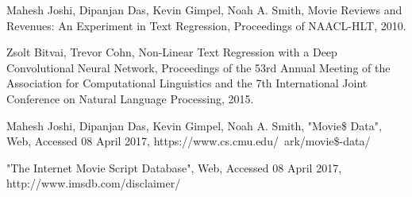 \documentclass[11pt]{article}
\begin{document}
\begin{thebibliography}{9}

  Mahesh Joshi, Dipanjan Das, Kevin Gimpel, Noah A. Smith,
  Movie Reviews and Revenues: An Experiment in Text Regression,
  Proceedings of NAACL-HLT,
  2010.
  
    Zsolt Bitvai, Trevor Cohn,
    Non-Linear Text Regression with a Deep Convolutional Neural Network,
    Proceedings of the 53rd Annual Meeting of the Association for Computational Linguistics
    and the 7th International Joint Conference on Natural Language Processing,
    2015.
    
  Mahesh Joshi, Dipanjan Das, Kevin Gimpel, Noah A. Smith,
  "Movie\$ Data",
  Web,
  Accessed 08 April 2017,
  https://www.cs.cmu.edu/~ark/movie\$-data/

    "The Internet Movie Script Database",
    Web,
    Accessed 08 April 2017,
    http://www.imsdb.com/disclaimer/
  
\end{thebibliography}
\end{document}
